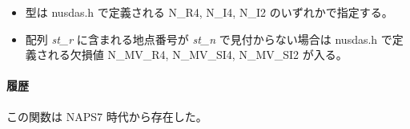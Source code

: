 \begin{itemize}
\item 型は nusdas.h で定義される N\_R4, N\_I4, N\_I2 のいずれかで指定する。
\item 配列 {\it st\_r} に含まれる地点番号が {\it st\_n} で見付からない場合は
nusdas.h で定義される欠損値 N\_MV\_R4, N\_MV\_SI4, N\_MV\_SI2 が入る。
\end{itemize}
\paragraph{履歴}
この関数は NAPS7 時代から存在した。

